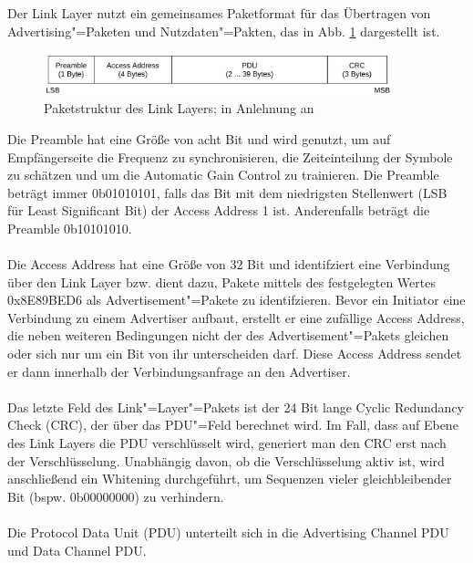 Der Link Layer nutzt ein gemeinsames Paketformat für das Übertragen von Advertising"=Paketen und Nutzdaten"=Pakten, das in Abb. \ref{fig: ll paket struktur} dargestellt ist.\\

\begin{figure}[H]
    \centering
    \includegraphics[width=0.9\textwidth]{graphics/link_layer_packetformat.pdf}
    \caption[Paketstruktur des Link Layers]{Paketstruktur des Link Layers; in Anlehnung an \cite{BtSpec4.0_fig_2200}}
    \label{fig: ll paket struktur}
\end{figure}

Die Preamble hat eine Größe von acht Bit und wird genutzt, um auf Empfängerseite die Frequenz zu synchronisieren, die Zeiteinteilung der Symbole zu schätzen und um die Automatic Gain Control zu trainieren. Die Preamble beträgt immer 0b01010101, falls das Bit mit dem niedrigsten Stellenwert (LSB für Least Significant Bit) der Access Address 1 ist. Anderenfalls beträgt die Preamble 0b10101010. \cite{BtSpec4.0_2200-2201}
\\\\
Die Access Address hat eine Größe von 32 Bit und identifziert eine Verbindung über den Link Layer bzw. dient dazu, Pakete mittels des festgelegten Wertes 0x8E89BED6 als Advertisement"=Pakete zu identifzieren. Bevor ein Initiator eine Verbindung zu einem Advertiser aufbaut, erstellt er eine zufällige Access Address, die neben weiteren Bedingungen nicht der des Advertisement"=Pakets gleichen oder sich nur um ein Bit von ihr unterscheiden darf. Diese Access Address sendet er dann innerhalb der Verbindungsanfrage an den Advertiser. \cite{BtSpec4.0_2200-2201}
\\\\
Das letzte Feld des Link"=Layer"=Pakets ist der 24 Bit lange Cyclic Redundancy Check (CRC), der über das PDU"=Feld berechnet wird. Im Fall, dass auf Ebene des Link Layers die PDU verschlüsselt wird, generiert man den CRC erst nach der Verschlüsselung. Unabhängig davon, ob die Verschlüsselung aktiv ist, wird anschließend ein Whitening \cite{BtSpec4.0_2217-2218} durchgeführt, um Sequenzen vieler gleichbleibender Bit (bspw. 0b00000000) zu verhindern. \cite{BtSpec4.0_2200-2201}
\\\\
Die Protocol Data Unit (PDU) unterteilt sich in die Advertising Channel PDU und Data Channel PDU.

